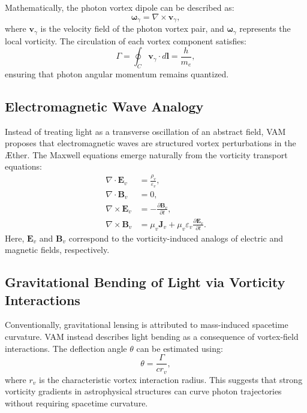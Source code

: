Mathematically, the photon vortex dipole can be described as:
\begin{equation}
    \boldsymbol{\omega}_{\gamma} = \nabla \times \mathbf{v}_{\gamma},
\end{equation}
where $\mathbf{v}_{\gamma}$ is the velocity field of the photon vortex pair, and $\boldsymbol{\omega}_{\gamma}$ represents the local vorticity. The circulation of each vortex component satisfies:
\begin{equation}
    \Gamma = \oint_C \mathbf{v}_{\gamma} \cdot d\mathbf{l} = \frac{h}{m_e},
\end{equation}
ensuring that photon angular momentum remains quantized.

\subsection{Electromagnetic Wave Analogy}
Instead of treating light as a transverse oscillation of an abstract field, VAM proposes that electromagnetic waves are structured vortex perturbations in the \AE ther. The Maxwell equations emerge naturally from the vorticity transport equations:
\begin{align}
    \nabla \cdot \mathbf{E}_v &= \frac{\rho_v}{\varepsilon_v}, \\
    \nabla \cdot \mathbf{B}_v &= 0, \\
    \nabla \times \mathbf{E}_v &= - \frac{\partial \mathbf{B}_v}{\partial t}, \\
    \nabla \times \mathbf{B}_v &= \mu_v \mathbf{J}_v + \mu_v \varepsilon_v \frac{\partial \mathbf{E}_v}{\partial t}.
\end{align}
Here, $\mathbf{E}_v$ and $\mathbf{B}_v$ correspond to the vorticity-induced analogs of electric and magnetic fields, respectively.

\subsection{Gravitational Bending of Light via Vorticity Interactions}
Conventionally, gravitational lensing is attributed to mass-induced spacetime curvature. VAM instead describes light bending as a consequence of vortex-field interactions. The deflection angle $\theta$ can be estimated using:
\begin{equation}
    \theta = \frac{\Gamma}{c r_v},
\end{equation}
where $r_v$ is the characteristic vortex interaction radius. This suggests that strong vorticity gradients in astrophysical structures can curve photon trajectories without requiring spacetime curvature.

